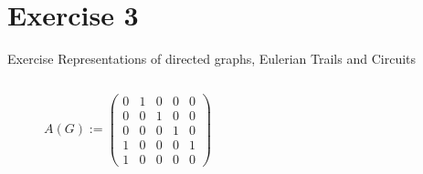 
\section{Exercise 3}

\setcounter{exercise}{1}

\begin{frame}[allowframebreaks]{Exercise \thesection}{Representations of directed graphs, Eulerian Trails and Circuits}
    \begin{exercisenoinc}
      \begin{columns}
        \begin{column}{0.5\textwidth}
          \begin{figure}[H]
            \centering
            $A(G) :=
            \begin{pmatrix}
              0 & 1 & 0 & 0 & 0 \\ %
              0 & 0 & 1 & 0 & 0 \\ %
              0 & 0 & 0 & 1 & 0 \\ %
              1 & 0 & 0 & 0 & 1 \\ %
              1 & 0 & 0 & 0 & 0 %
            \end{pmatrix}$
          \end{figure}
        \end{column}
        \begin{column}{0.5\textwidth}
        \end{column}
      \end{columns}
    \end{exercisenoinc}
    \begin{solution}
      \begin{columns}
\end{columns}
\end{solution}
\end{frame}
